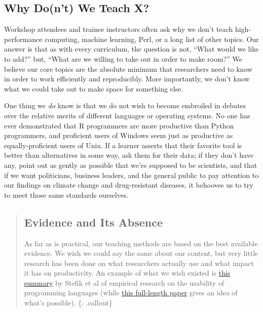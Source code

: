 \subsection{Why Do(n't) We Teach X?}\label{why-dont-we-teach-x}

Workshop attendees and trainee instructors often ask why we don't teach
high-performance computing, machine learning, Perl, or a long list of
other topics. Our answer is that as with every curriculum, the question
is not, ``What would we like to add?'' but, ``What are we willing to
take out in order to make room?'' We believe our core topics are the
absolute minimum that researchers need to know in order to work
efficiently and reproducibly. More importantly, we don't know what we
could take out to make space for something else.

One thing we \emph{do} know is that we do not wish to become embroiled
in debates over the relative merits of different languages or operating
systems. No one has ever demonstrated that R programmers are more
productive than Python programmers, and proficient users of Windows seem
just as productive as equally-proficient users of Unix. If a learner
asserts that their favorite tool is better than alternatives in some
way, ask them for their data; if they don't have any, point out as
gently as possible that we're supposed to be scientists, and that if we
want politicians, business leaders, and the general public to pay
attention to our findings on climate change and drug-resistant diseases,
it behooves us to try to meet those same standards ourselves.

\begin{quote}
\subsection{Evidence and Its Absence}\label{evidence-and-its-absence}

As far as is practical, our teaching methods are based on the best
available evidence. We wish we could say the same about our content, but
very little research has been done on what researchers actually use and
what impact it has on productivity. An example of what we wish existed
is
\href{\{\{\%20page.root\%20\}\}/files/papers/stefik-evidence-2016.pdf}{this
summary} by Stefik et al of empirical research on the usability of
programming languages (while
\href{https://dl.acm.org/citation.cfm?id=2534973}{this full-length
paper} gives an idea of what's possible). \{: .callout\}
\end{quote}

